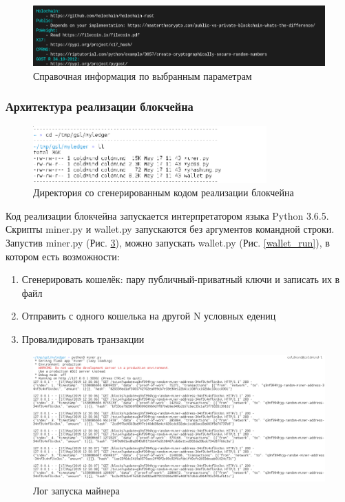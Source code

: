 \begin{figure}[h]
    \centering
    \includegraphics[width=\textwidth]{images/spravochno}
    \caption{Справочная информация по выбранным параметрам}\label{sprav}
\end{figure}

\subsubsection{Архитектура реализации блокчейна}
\begin{figure}[h]
    \centering
    \includegraphics[width=0.8\textwidth]{images/ledger_ll}
    \caption{Директория со сгенерированным кодом реализации блокчейна}\label{ll}
\end{figure}

Код реализации блокчейна запускается интерпретатором языка Python 3.6.5.
Скрипты {\small miner.py} и {\small wallet.py} запускаются без аргументов
командной строки. Запустив {\small miner.py} (Рис. \ref{miner_run}), можно запускать {\small
wallet.py} (Рис. \ref{wallet_run}), в котором есть возможности:
\begin{enumerate}
    \item Сгенерировать кошелёк: пару публичный-приватный ключи и записать их в файл
    \item Отправить с одного кошелька на другой N условных едениц
    \item Провалидировать транзакции
\end{enumerate}

\begin{figure}[h]
    \centering
    \includegraphics[width=\textwidth]{images/miner_run}
    \caption{Лог запуска майнера}\label{miner_run}
\end{figure}

